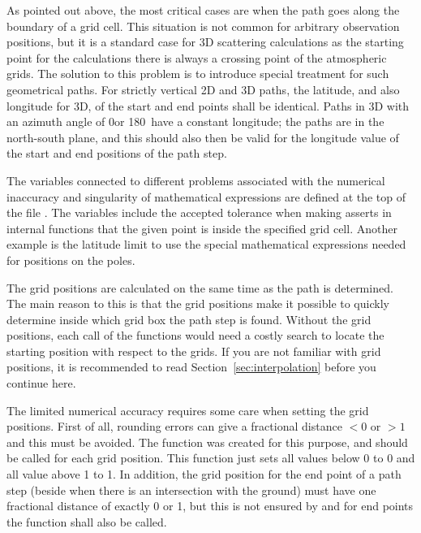 As pointed out above, the most critical cases are when the path goes
along the boundary of a grid cell. This situation is not common for
arbitrary observation positions, but it is a standard case for 3D
scattering calculations as the starting point for the calculations
there is always a crossing point of the atmospheric grids. The
solution to this problem is to introduce special treatment for such
geometrical paths. For strictly vertical 2D and 3D paths, the
latitude, and also longitude for 3D, of the start and end points shall
be identical. Paths in 3D with an azimuth angle of 0\degree or
180\degree\ have a constant longitude; the paths are in the north-south
plane, and this should also then be valid for the longitude value of
the start and end positions of the path step.

The variables connected to different problems associated with the
numerical inaccuracy and singularity of mathematical expressions are
defined at the top of the file . The variables
include the accepted tolerance when making asserts in internal
functions that the given point is inside the specified grid cell.
Another example is the latitude limit to use the special mathematical
expressions needed for positions on the poles.




The grid positions are calculated on the same time as the path is
determined. The main reason to this is that the grid positions make it
possible to quickly determine inside which grid box the path step is
found. Without the grid positions, each call of the functions would
need a costly search to locate the starting position with respect to
the grids. If you are not familiar with grid positions, it is
recommended to read Section~\ref{sec:interpolation} before you
continue here.

The limited numerical accuracy requires some care when setting the
grid positions. First of all, rounding errors can give a fractional
distance $< 0$ or $> 1$ and this must be avoided. The function
 was created for this purpose, and
should be called for each grid position. This function just
sets all values below 0 to 0 and all value above 1 to 1. In addition,
the grid position for the end point of a path step (beside when there
is an intersection with the ground) must have one fractional
distance of exactly 0 or 1, but this is not ensured by
 and for end points the function
 shall also be called.

